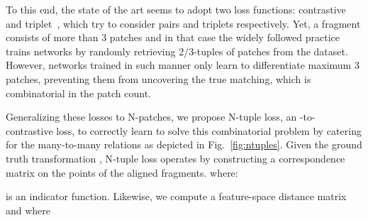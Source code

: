 \documentclass[10pt,twocolumn,letterpaper]{article}
\theoremstyle{break}
\begin{document}
To this end, the state of the art seems to adopt two loss functions: contrastive~\cite{zeng20163dmatch} and triplet~\cite{Khoury_2017_ICCV}, which try to consider pairs and triplets respectively. Yet, a fragment consists of more than 3 patches and in that case the widely followed practice trains networks by randomly retrieving 2/3-tuples of patches from the dataset. However, networks trained in such manner only learn to differentiate maximum 3 patches, preventing them from uncovering the true matching, which is combinatorial in the patch count. 

Generalizing these losses to N-patches, we propose N-tuple loss, an -to- contrastive loss, to correctly learn to solve this combinatorial problem by catering for the many-to-many relations as depicted in Fig.~\ref{fig:ntuples}. Given the ground truth transformation , 
N-tuple loss operates by constructing a correspondence matrix  on the points of the aligned fragments.  where:

 is an indicator function. Likewise, we compute a feature-space distance matrix  and  where
\end{document}
